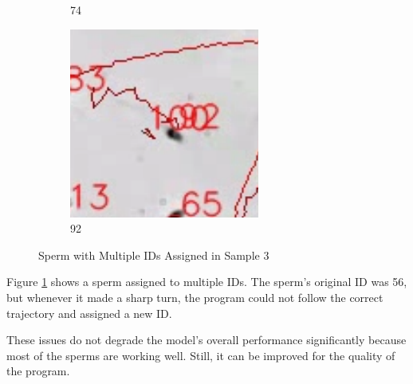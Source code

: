 \begin{figure}[h]
\begin{subfigure}[b]{0.3\textwidth}
         \caption{74 }
     \end{subfigure}
     \hfill
     \begin{subfigure}[b]{0.3\textwidth}
         \centering
         \includegraphics[width=\textwidth]{Images/sam333333333.png}
         \caption{92 }
     \end{subfigure}
        \caption{Sperm with Multiple IDs Assigned in Sample 3}
        \label{sam3mult}
\end{figure}

Figure \ref{sam3mult} shows a sperm assigned to multiple IDs. The sperm's original ID was 56, but whenever it made a sharp turn, the program could not follow the correct trajectory and assigned a new ID. 

These issues do not degrade the model's overall performance significantly because most of the sperms are working well. Still, it can be improved for the quality of the program.

\newpage
